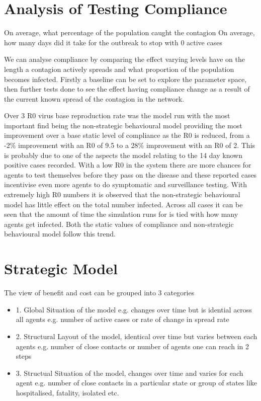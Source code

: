 \documentclass{article}
\begin{document}
\section{Analysis of Testing Compliance}

On average, what percentage of the population caught the contagion
On average, how many days did it take for the outbreak to stop with 0 active cases

We can analyse compliance by comparing the effect varying levels have on the length a contagion actively spreads and what proportion of the population becomes infected. Firstly a baseline can be set to explore the parameter space, then further tests done to see the effect having compliance change as a result of the current known spread of the contagion in the network.



Over 3 R0 virus base reproduction rate was the model run with the most important find being the non-strategic behavioural model providing the most improvement over a base static level of compliance as the R0 is reduced, from a -2\% improvement with an R0 of 9.5 to a 28\% improvement with an R0 of 2. This is probably due to one of the aspects the model relating to the 14 day known positive cases recorded. With a low R0 in the system there are more chances for agents to test themselves before they pass on the disease and these reported cases incentivise even more agents to do symptomatic and surveillance testing. With extremely high R0 numbers it is observed that the non-strategic behavioural model has little effect on the total number infected. Across all cases it can be seen that the amount of time the simulation runs for is tied with how many agents get infected. Both the static values of compliance and non-strategic behavioural model follow this trend. 



\section{Strategic Model}
The view of benefit and cost can be grouped into 3 categories
\begin{itemize}
\item1. Global Situation of the model e.g. changes over time but is idential across all agents
e.g. number of active cases or rate of change in spread rate
\item2. Structural Layout of the model, identical over time but varies between each agents
e.g. number of close contacts or number of agents one can reach in 2 steps 
\item3. Structual Situation of the model, changes over time and varies for each agent
e.g. number of close contacts in a particular state or group of states like hospitalised, fatality, isolated etc.
\end{itemize}
\end{document}
